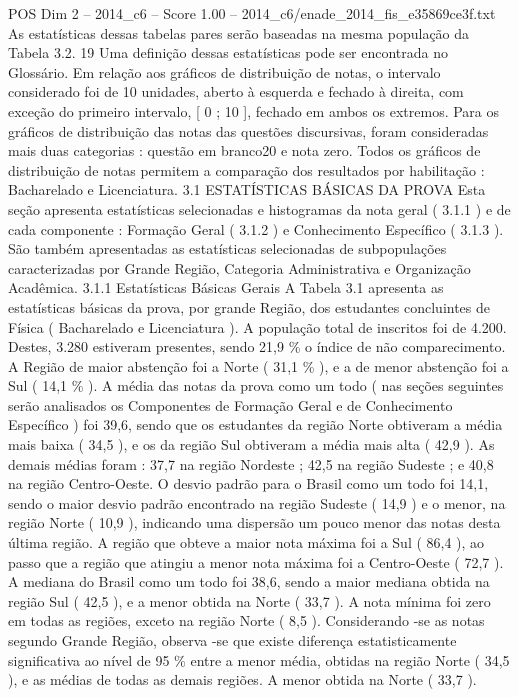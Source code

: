 \begin{textsample}{POS Dim 2 – 2014\_c6 – Score 1.00 – 2014\_c6/enade\_2014\_fis\_e35869ce3f.txt}
As estatísticas dessas tabelas pares serão baseadas na mesma população da Tabela 3.2. 19 Uma definição dessas estatísticas pode ser encontrada no Glossário.
Em relação aos gráficos de distribuição de notas, o intervalo considerado foi de 10 unidades, aberto à esquerda e fechado à direita, com exceção do primeiro intervalo, [ 0 ; 10 ], fechado em ambos os extremos.
Para os gráficos de distribuição das notas das questões discursivas, foram consideradas mais duas categorias : questão em branco20 e nota zero.
Todos os gráficos de distribuição de notas permitem a comparação dos resultados por habilitação : Bacharelado e Licenciatura. 3.1 ESTATÍSTICAS BÁSICAS DA PROVA Esta seção apresenta estatísticas selecionadas e histogramas da nota geral ( 3.1.1 ) e de cada componente : Formação Geral ( 3.1.2 ) e Conhecimento Específico ( 3.1.3 ).
São também apresentadas as estatísticas selecionadas de subpopulações caracterizadas por Grande Região, Categoria Administrativa e Organização Acadêmica. 3.1.1 Estatísticas Básicas Gerais A Tabela 3.1 apresenta as estatísticas básicas da prova, por grande Região, dos estudantes concluintes de Física ( Bacharelado e Licenciatura ).
A população total de inscritos foi de 4.200.
Destes, 3.280 estiveram presentes, sendo 21,9 \% o índice de não comparecimento.
A Região de maior abstenção foi a Norte ( 31,1 \% ), e a de menor abstenção foi a Sul ( 14,1 \% ).
A média das notas da prova como um todo ( nas seções seguintes serão analisados os Componentes de Formação Geral e de Conhecimento Específico ) foi 39,6, sendo que os estudantes da região Norte obtiveram a média mais baixa ( 34,5 ), e os da região Sul obtiveram a média mais alta ( 42,9 ).
As demais médias foram : 37,7 na região Nordeste ; 42,5 na região Sudeste ; e 40,8 na região Centro-Oeste.
O desvio padrão para o Brasil como um todo foi 14,1, sendo o maior desvio padrão encontrado na região Sudeste ( 14,9 ) e o menor, na região Norte ( 10,9 ), indicando uma dispersão um pouco menor das notas desta última região.
A região que obteve a maior nota máxima foi a Sul ( 86,4 ), ao passo que a região que atingiu a menor nota máxima foi a Centro-Oeste ( 72,7 ).
A mediana do Brasil como um todo foi 38,6, sendo a maior mediana obtida na região Sul ( 42,5 ), e a menor obtida na Norte ( 33,7 ).
A nota mínima foi zero em todas as regiões, exceto na região Norte ( 8,5 ).
Considerando -se as notas segundo Grande Região, observa -se que existe diferença estatisticamente significativa ao nível de 95 \% entre a menor média, obtidas na região Norte ( 34,5 ), e as médias de todas as demais regiões.
A menor obtida na Norte ( 33,7 ).

\end{textsample}
